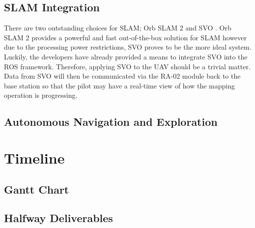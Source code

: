 \documentclass[english]{upeeei}
\begin{document}
\section{SLAM Integration}
There are two outstanding choices for SLAM; Orb SLAM 2 \cite{OrbSlam2} and SVO \cite{SVO2017}. Orb SLAM 2 provides a
powerful and fast out-of-the-box solution for SLAM however due to the processing power restrictions, SVO proves to be the
more ideal system. Luckily, the developers have already provided a means to integrate SVO into the ROS framework.
Therefore, applying SVO to the UAV should be a trivial matter. Data from SVO will then be communicated via the RA-02
module back to the base station so that the pilot may have a real-time view of how the mapping operation is progressing.
\section{Autonomous Navigation and Exploration}

\chapter{Timeline}
\section{Gantt Chart}
\section{Halfway Deliverables}

\printbibliography[
heading=bibintoc,
title={Bibliography}
]
\end{document}
